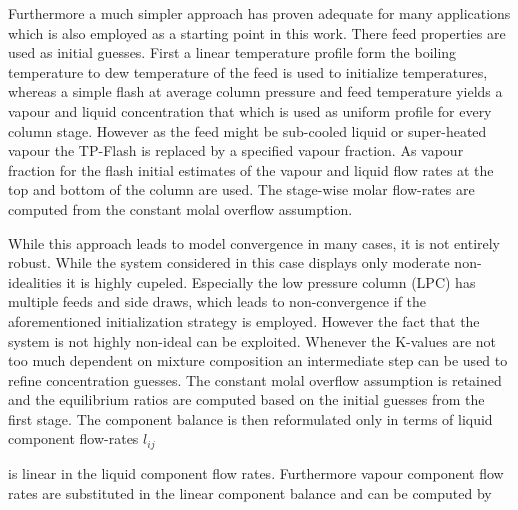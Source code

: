         Furthermore a much simpler approach has proven adequate for many applications \cite{Henley.op.2011}
        which is also employed as a starting point in this work.
        There feed properties are used as initial guesses. First a linear temperature profile form the boiling
        temperature to dew temperature of the feed is used to initialize temperatures, whereas a simple flash
        at average column pressure and feed temperature yields a vapour and liquid concentration that which is
        used as uniform profile for every column stage. However as the feed might be sub-cooled liquid or
        super-heated vapour the TP-Flash is replaced by a specified vapour fraction. As vapour fraction
        for the flash initial estimates of the vapour and liquid flow rates at the top and bottom of the
        column are used. The stage-wise molar flow-rates are computed from the constant molal overflow
        assumption.

        While this approach leads to model convergence in many cases, it is not entirely robust.
        While the system considered in this case displays only moderate non-idealities it is highly cupeled.
        Especially the low pressure column (LPC) has multiple feeds and side draws, which leads to non-convergence
        if the aforementioned initialization strategy is employed. However the fact that the system is
        not highly non-ideal can be exploited. Whenever the K-values are not too much dependent on mixture
        composition an intermediate step can be used to refine concentration guesses. The constant molal
        overflow assumption is retained and the equilibrium ratios are computed based on the initial guesses
        from the first stage. The component balance is then reformulated only in terms of liquid component
        flow-rates $l_{ij}$


         is linear in the liquid component flow rates. Furthermore vapour component
        flow rates are substituted in the linear component balance and can be computed by

